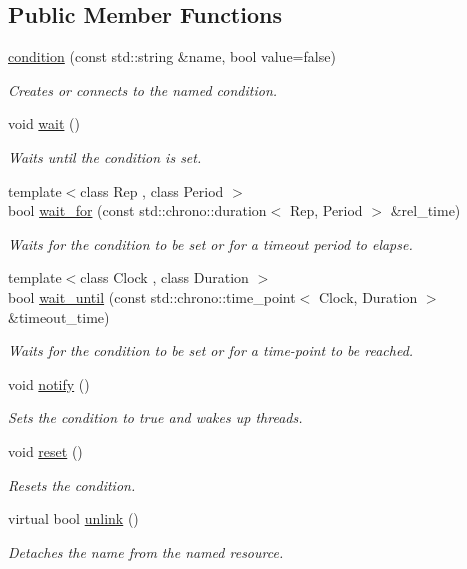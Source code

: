\subsection*{Public Member Functions}
\begin{DoxyCompactItemize}
\item 
\hyperlink{classcpen333_1_1process_1_1condition_a584deae08b94a2f6a49abca119183571}{condition} (const std\+::string \&name, bool value=false)
\begin{DoxyCompactList}\small\item\em Creates or connects to the named condition. \end{DoxyCompactList}\item 
void \hyperlink{classcpen333_1_1process_1_1condition_a24b3c16a8fdd333e95bf93dc07a65742}{wait} ()
\begin{DoxyCompactList}\small\item\em Waits until the condition is set. \end{DoxyCompactList}\item 
{\footnotesize template$<$class Rep , class Period $>$ }\\bool \hyperlink{classcpen333_1_1process_1_1condition_ac14bac38a3fd158af7ecf1fe5a993a40}{wait\+\_\+for} (const std\+::chrono\+::duration$<$ Rep, Period $>$ \&rel\+\_\+time)
\begin{DoxyCompactList}\small\item\em Waits for the condition to be set or for a timeout period to elapse. \end{DoxyCompactList}\item 
{\footnotesize template$<$class Clock , class Duration $>$ }\\bool \hyperlink{classcpen333_1_1process_1_1condition_a07cd864a2e089b9e1c9d468e8cd8ea62}{wait\+\_\+until} (const std\+::chrono\+::time\+\_\+point$<$ Clock, Duration $>$ \&timeout\+\_\+time)
\begin{DoxyCompactList}\small\item\em Waits for the condition to be set or for a time-\/point to be reached. \end{DoxyCompactList}\item 
void \hyperlink{classcpen333_1_1process_1_1condition_a7819f5c1e213863214a4935b0157fd8c}{notify} ()
\begin{DoxyCompactList}\small\item\em Sets the condition to {\ttfamily true} and wakes up threads. \end{DoxyCompactList}\item 
void \hyperlink{classcpen333_1_1process_1_1condition_a6b3f2a59fa85ddc3d53b60bd1a6a8556}{reset} ()
\begin{DoxyCompactList}\small\item\em Resets the condition. \end{DoxyCompactList}\item 
virtual bool \hyperlink{classcpen333_1_1process_1_1condition_a7c646204b2c4912185ba6055c9afa3f6}{unlink} ()
\begin{DoxyCompactList}\small\item\em Detaches the name from the named resource. \end{DoxyCompactList}\end{DoxyCompactItemize}
